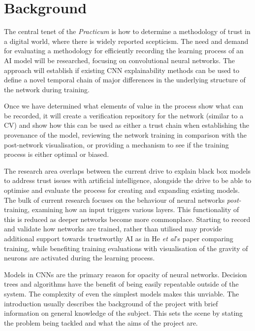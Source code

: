 \section{Background}

The central tenet of the \textit{Practicum} is how to determine a methodology of trust in a digital world, where there is widely reported scepticism. The need and demand for evaluating a methodology for efficiently recording the learning process of an AI model will be researched, focusing on convolutional neural networks. The approach will establish if existing CNN explainability methods can be used to define a novel temporal chain of major differences in the underlying structure of the network during training.
 
Once we have determined what elements of value in the process show what can be recorded, it will create a verification repository for the network (similar to a CV) and show how this can be used as either a trust chain when establishing the provenance of the model, reviewing the network training in comparison with the post-network visualisation, or providing a mechanism to see if the training process is either optimal or biased.

The research area overlaps between the current drive to explain black box models to address trust issues with artificial intelligence\cite{ryanAIWeTrust2020}, alongside the drive to be able to optimise and evaluate the process for creating and expanding existing models. The bulk of current research focuses on the behaviour of neural networks \textit{post-}training, examining how an input triggers various layers. This functionality of this is reduced as deeper networks become more commonplace. Starting to record and validate how networks are trained, rather than utilised may provide additional support towards trustworthy AI as in He \textit{et al}'s paper comparing training\cite{heDeepResidualLearning2015a}, while benefiting training evaluations with visualisation of the gravity of neurons are activated during the learning process.

Models in CNNs are the primary reason for opacity of neural networks. Decision trees and algorithms have the benefit of being easily repeatable outside of the system. The complexity of even the simplest models makes this unviable. The introduction usually describes the background of the project with brief information on general knowledge of the subject. This sets the scene by stating the problem being tackled and what the aims of the project are.

